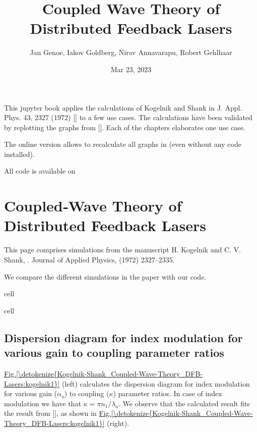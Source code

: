 \documentclass[a4paper,10pt,english,openany,oneside]{jupyterBook}
\title{Coupled Wave Theory of Distributed Feedback Lasers}
\date{Mar 23, 2023}
\author{Jan Genoe, Iakov Goldberg, Nirav Annavarapu, Robert Gehlhaar}
\begin{document}
\pagestyle{empty}
\sphinxmaketitle
\pagestyle{plain}
\sphinxtableofcontents
\pagestyle{normal}
\label{\detokenize{intro::doc}}


\sphinxAtStartPar
This jupyter book applies the calculations of Kogelnik and Shank in J. Appl. Phys. 43, 2327 (1972) {[}{]} to a few use cases.
The calculations have been validated by replotting the graphs from {[}{]}.
Each of the chapters elaborates one use case.

\sphinxAtStartPar
The online version allows to recalculate all graphs in  (even without any code installed).

\sphinxAtStartPar
All code is available on 

\sphinxstepscope


\chapter{Coupled‐Wave Theory of Distributed Feedback Lasers}
\label{\detokenize{Kogelnik-Shank_Coupled-Wave-Theory_DFB-Lasers:coupledwave-theory-of-distributed-feedback-lasers}}\label{\detokenize{Kogelnik-Shank_Coupled-Wave-Theory_DFB-Lasers::doc}}
\sphinxAtStartPar
This page comprises simulations from the manuscript H. Kogelnik and C. V. Shank, . Journal of Applied Physics,  (1972) 2327–2335. 

\sphinxAtStartPar
We compare the different simulations in the paper with our code.

\begin{sphinxuseclass}{cell}
\end{sphinxuseclass}
\begin{sphinxuseclass}{cell}
\end{sphinxuseclass}

\section{Dispersion diagram for index modulation for various gain to coupling parameter ratios}
\label{\detokenize{Kogelnik-Shank_Coupled-Wave-Theory_DFB-Lasers:dispersion-diagram-for-index-modulation-for-various-gain-to-coupling-parameter-ratios}}
\sphinxAtStartPar
\hyperref[\detokenize{Kogelnik-Shank_Coupled-Wave-Theory_DFB-Lasers:kogelnik1}]{Fig.\@ \ref{\detokenize{Kogelnik-Shank_Coupled-Wave-Theory_DFB-Lasers:kogelnik1}}} (left) calculates the dispersion diagram for index modulation for various gain (\(\alpha_o\)) to coupling (\(\kappa\)) parameter ratios. In case of index modulation we have that \(\kappa= \pi n_1/\lambda_o\). We observe that the calculated result fits the result from {[}{]}, as shown in \hyperref[\detokenize{Kogelnik-Shank_Coupled-Wave-Theory_DFB-Lasers:kogelnik1}]{Fig.\@ \ref{\detokenize{Kogelnik-Shank_Coupled-Wave-Theory_DFB-Lasers:kogelnik1}}} (right).
\end{document}
